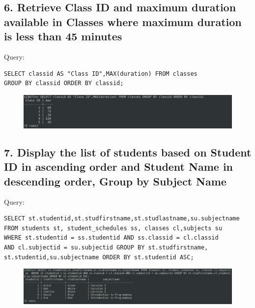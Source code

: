 \documentclass{article}
\begin{document}
\subsection*{6. Retrieve Class ID and maximum duration available in Classes where maximum duration is less than 45 minutes}
Query:
\begin{Verbatim}[frame=single,framerule=1pt,fontfamily=courier,fontsize=\small]
SELECT classid AS "Class ID",MAX(duration) FROM classes 
GROUP BY classid ORDER BY classid;
\end{Verbatim}
\begin{figure}[H]
    \centering
    \includegraphics[width=\textwidth]{cycle3/3.6.png}
\end{figure}

\subsection*{7. Display the list of students based on Student ID in ascending order and Student Name in descending order, Group by Subject Name}
Query:
\begin{Verbatim}[frame=single,framerule=1pt,fontfamily=courier,fontsize=\small]
SELECT st.studentid,st.studfirstname,st.studlastname,su.subjectname 
FROM students st, student_schedules ss, classes cl,subjects su  
WHERE st.studentid = ss.studentid AND ss.classid = cl.classid 
AND cl.subjectid = su.subjectid GROUP BY st.studfirstname,
st.studentid,su.subjectname ORDER BY st.studentid ASC;
\end{Verbatim}
\begin{figure}[H]
    \centering
    \includegraphics[width=\textwidth]{cycle3/3.7.png}
\end{figure}
\end{document}
